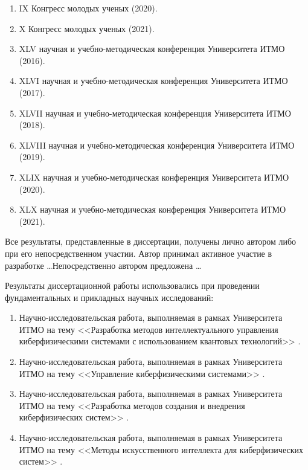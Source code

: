 \begin{enumerate}[beginpenalty=10000]
	\item IX Конгресс молодых ученых (2020).
	\item X Конгресс молодых ученых (2021).
	\item XLV научная и учебно-методическая конференция Университета \mbox{ИТМО} (2016).
	\item XLVI научная и учебно-методическая конференция Университета \mbox{ИТМО} (2017).
	\item XLVII научная и учебно-методическая конференция Университета \mbox{ИТМО} (2018).
	\item XLVIII научная и учебно-методическая конференция Университета \mbox{ИТМО} (2019).
	\item XLIX научная и учебно-методическая конференция Университета \mbox{ИТМО} (2020).
	\item XLX научная и учебно-методическая конференция Университета \mbox{ИТМО} (2021).
\end{enumerate}

{\contribution} Все результаты, представленные в диссертации, получены лично автором либо при его непосредственном участии. Автор принимал активное участие в разработке \dots Непосредственно автором предложена \dots

{\implementation} Результаты диссертационной работы использовались при проведении фундаментальных и прикладных научных исследований:

\begin{enumerate}[beginpenalty=10000]
	\item Научно-исследовательская работа, выполняемая в рамках Университета ИТМО на тему <<Разработка методов интеллектуального управления киберфизическими системами с использованием квантовых технологий>>  .
	\item Научно-исследовательская работа, выполняемая в рамках Университета ИТМО на тему <<Управление киберфизическими системами>>  .
	\item Научно-исследовательская работа, выполняемая в рамках Университета ИТМО на тему <<Разработка методов создания и внедрения киберфизических систем>>  .
	\item Научно-исследовательская работа, выполняемая в рамках Университета ИТМО на тему <<Методы искусственного интеллекта для киберфизических систем>>  .
\end{enumerate}


